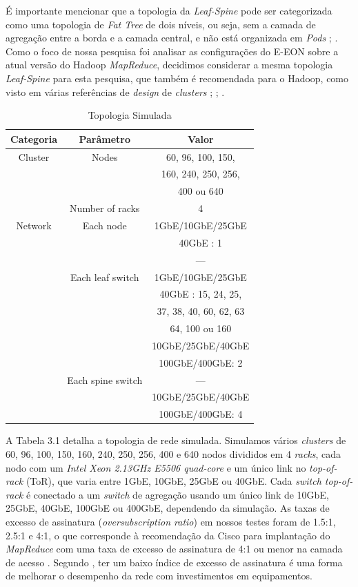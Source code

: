 É importante mencionar que a topologia da \emph{Leaf-Spine} pode ser categorizada como uma topologia de \emph{Fat Tree} de dois níveis, ou seja, sem a camada de agregação entre a borda e a camada central, e não está organizada em \emph{Pods} \cite{FatTreeDesign}; \cite{testa2017optical}. Como o foco de nossa pesquisa foi analisar as configurações do E-EON \cite{silva2018eon} sobre a atual versão do Hadoop \emph{MapReduce}, decidimos considerar a mesma topologia \emph{Leaf-Spine} para esta pesquisa, que também é recomendada para o Hadoop, como visto em várias referências de \emph{design} de \emph{clusters} \cite{bechtolsheim2011big}; \cite{efficiency2012cisco}; \cite{BigDataGuide}.

\begin{table}[!htp]
\centering
\caption{Topologia Simulada}
\label{Topologia Simulada}
\def\arraystretch{1.2}
\begin{tabular}{c c c}
\hline
Categoria & Parâmetro & Valor \\
\hline
Cluster & Nodes & 60, 96, 100, 150,\\
 & & 160, 240, 250, 256,\\
 & & 400 ou 640\\
 & Number of racks & 4\\
Network & Each node & 1GbE/10GbE/25GbE\\
 & & 40GbE : 1\\
 & & ---\\
 & Each leaf switch & 1GbE/10GbE/25GbE\\
 & & 40GbE : 15, 24, 25,\\
 & & 37, 38, 40, 60, 62, 63\\
 & & 64, 100 ou 160\\
 & & 10GbE/25GbE/40GbE\\
 & & 100GbE/400GbE: 2\\
 & Each spine switch & ---\\
 & & 10GbE/25GbE/40GbE\\
 & & 100GbE/400GbE: 4\\
\hline
\end{tabular}
\end{table}

A Tabela 3.1 detalha a topologia de rede simulada. Simulamos vários \emph{clusters} de 60, 96, 100, 150, 160, 240, 250, 256, 400 e 640 nodos divididos em 4 \emph{racks}, cada nodo com um \emph{Intel Xeon 2.13GHz E5506 quad-core} e um único link no \emph{top-of-rack} (ToR), que varia entre 1GbE, 10GbE, 25GbE ou 40GbE. Cada \emph{switch top-of-rack} é conectado a um \emph{switch} de agregação usando um único link de 10GbE, 25GbE, 40GbE, 100GbE ou 400GbE, dependendo da simulação. As taxas de excesso de assinatura (\emph{oversubscription ratio}) em nossos testes foram de 1.5:1, 2.5:1 e 4:1, o que corresponde à recomendação da Cisco para implantação do \emph{MapReduce} com uma taxa de excesso de assinatura de 4:1 ou menor na camada de acesso \cite{Cisco2011TechReport}. Segundo \cite{Clusterplaningguide}, ter um baixo índice de excesso de assinatura é uma forma de melhorar o desempenho da rede com investimentos em equipamentos.

